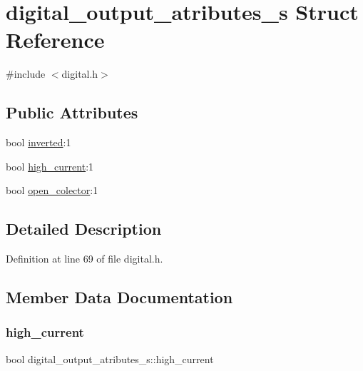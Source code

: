 \hypertarget{structdigital__output__atributes__s}{}\section{digital\+\_\+output\+\_\+atributes\+\_\+s Struct Reference}
\label{structdigital__output__atributes__s}


{\ttfamily \#include $<$digital.\+h$>$}

\subsection*{Public Attributes}
\begin{DoxyCompactItemize}
\item 
bool \hyperlink{structdigital__output__atributes__s_a4709cb6194851caa2437098537dea3d5}{inverted}\+:1
\item 
bool \hyperlink{structdigital__output__atributes__s_a6feea6c60404ece83e0e5f191f11ccf9}{high\+\_\+current}\+:1
\item 
bool \hyperlink{structdigital__output__atributes__s_aa0bdb62f77c81215ddaa1bf679c23796}{open\+\_\+colector}\+:1
\end{DoxyCompactItemize}


\subsection{Detailed Description}


Definition at line 69 of file digital.\+h.



\subsection{Member Data Documentation}
\mbox{\label{structdigital__output__atributes__s_a6feea6c60404ece83e0e5f191f11ccf9}} 
\subsubsection{\texorpdfstring{high\+\_\+current}{high\_current}}
{\footnotesize\ttfamily bool digital\+\_\+output\+\_\+atributes\+\_\+s\+::high\+\_\+current}



